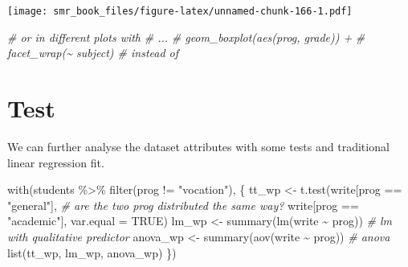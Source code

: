 \documentclass[
  oneside]{book}
\newenvironment{Shaded}{\begin{snugshade}}{\end{snugshade}}
\newcommand{\AttributeTok}[1]{\textcolor[rgb]{0.77,0.63,0.00}{#1}}
\newcommand{\CommentTok}[1]{\textcolor[rgb]{0.56,0.35,0.01}{\textit{#1}}}
\newcommand{\ConstantTok}[1]{\textcolor[rgb]{0.00,0.00,0.00}{#1}}
\newcommand{\FunctionTok}[1]{\textcolor[rgb]{0.00,0.00,0.00}{#1}}
\newcommand{\NormalTok}[1]{#1}
\newcommand{\OtherTok}[1]{\textcolor[rgb]{0.56,0.35,0.01}{#1}}
\newcommand{\SpecialCharTok}[1]{\textcolor[rgb]{0.00,0.00,0.00}{#1}}
\newcommand{\StringTok}[1]{\textcolor[rgb]{0.31,0.60,0.02}{#1}}
\begin{document}
\texttt{[image: smr\_book\_files/figure-latex/unnamed-chunk-166-1.pdf]}

\begin{Shaded}
\begin{Highlighting}[]
\CommentTok{\# or in different plots with}
\CommentTok{\#    ...}
\CommentTok{\#    geom\_boxplot(aes(prog, grade)) +}
\CommentTok{\#    facet\_wrap(\textasciitilde{} subject) \# instead of }
\end{Highlighting}
\end{Shaded}

\hypertarget{test}{%
\section{Test}\label{test}}

We can further analyse the dataset attributes with some tests and
traditional linear regression fit.

\begin{Shaded}
\begin{Highlighting}[]
\FunctionTok{with}\NormalTok{(students }\SpecialCharTok{\%\textgreater{}\%} \FunctionTok{filter}\NormalTok{(prog }\SpecialCharTok{!=} \StringTok{"vocation"}\NormalTok{), \{}
\NormalTok{  tt\_wp }\OtherTok{\textless{}{-}} \FunctionTok{t.test}\NormalTok{(write[prog }\SpecialCharTok{==} \StringTok{"general"}\NormalTok{], }\CommentTok{\# are the two prog distributed the same way?}
\NormalTok{         write[prog }\SpecialCharTok{==} \StringTok{"academic"}\NormalTok{], }\AttributeTok{var.equal =} \ConstantTok{TRUE}\NormalTok{)}
\NormalTok{  lm\_wp }\OtherTok{\textless{}{-}} \FunctionTok{summary}\NormalTok{(}\FunctionTok{lm}\NormalTok{(write }\SpecialCharTok{\textasciitilde{}}\NormalTok{ prog)) }\CommentTok{\# lm with qualitative predictor}
\NormalTok{  anova\_wp }\OtherTok{\textless{}{-}} \FunctionTok{summary}\NormalTok{(}\FunctionTok{aov}\NormalTok{(write }\SpecialCharTok{\textasciitilde{}}\NormalTok{ prog)) }\CommentTok{\# anova}
  \FunctionTok{list}\NormalTok{(tt\_wp, lm\_wp, anova\_wp)}
\NormalTok{ \})}
\end{Highlighting}
\end{Shaded}
\end{document}
